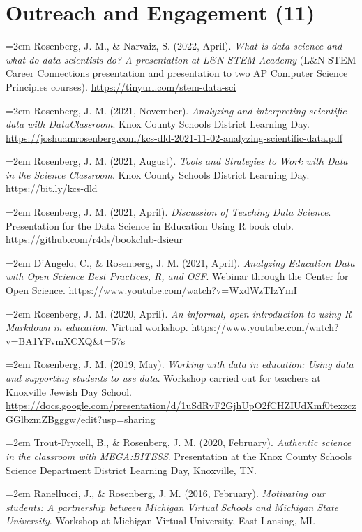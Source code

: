 \documentclass[
  14,
]{article}
\begin{document}
\hypertarget{outreach-and-engagement-11}{%
\section{Outreach and Engagement
(11)}\label{outreach-and-engagement-11}}

\hangindent=2em Rosenberg, J. M., \& Narvaiz, S. (2022, April).
\emph{What is data science and what do data scientists do? A
presentation at L\&N STEM Academy} (L\&N STEM Career Connections
presentation and presentation to two AP Computer Science Principles
courses). \url{https://tinyurl.com/stem-data-sci}

\hangindent=2em Rosenberg, J. M. (2021, November). \emph{Analyzing and
interpreting scientific data with DataClassroom}. Knox County Schools
District Learning Day.
\url{https://joshuamrosenberg.com/kcs-dld-2021-11-02-analyzing-scientific-data.pdf}

\hangindent=2em Rosenberg, J. M. (2021, August). \emph{Tools and
Strategies to Work with Data in the Science Classroom}. Knox County
Schools District Learning Day. \url{https://bit.ly/kcs-dld}

\hangindent=2em Rosenberg, J. M. (2021, April). \emph{Discussion of
Teaching Data Science}. Presentation for the Data Science in Education
Using R book club. \url{https://github.com/r4ds/bookclub-dsieur}

\hangindent=2em D'Angelo, C., \& Rosenberg, J. M. (2021, April).
\emph{Analyzing Education Data with Open Science Best Practices, R, and
OSF}. Webinar through the Center for Open Science.
\url{https://www.youtube.com/watch?v=WxdWzTIzYmI}

\hangindent=2em Rosenberg, J. M. (2020, April). \emph{An informal, open
introduction to using R Markdown in education}. Virtual workshop.
\url{https://www.youtube.com/watch?v=BA1YFvmXCXQ\&t=57s}

\hangindent=2em Rosenberg, J. M. (2019, May). \emph{Working with data in
education: Using data and supporting students to use data}. Workshop
carried out for teachers at Knoxville Jewish Day School.
\url{https://docs.google.com/presentation/d/1uSdRvF2GjhUpO2fCHZIUdXmf0texzczGGlbzmZBgggw/edit?usp=sharing}

\hangindent=2em Trout-Fryxell, B., \& Rosenberg, J. M. (2020, February).
\emph{Authentic science in the classroom with MEGA:BITESS}. Presentation
at the Knox County Schools Science Department District Learning Day,
Knoxville, TN.

\hangindent=2em Ranellucci, J., \& Rosenberg, J. M. (2016, February).
\emph{Motivating our students: A partnership between Michigan Virtual
Schools and Michigan State University}. Workshop at Michigan Virtual
University, East Lansing, MI.
\end{document}
